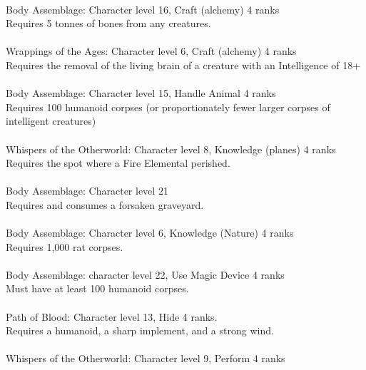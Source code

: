 \begin{multicols}{2}
\begin{small}
\\
Body Assemblage: Character level 16, Craft (alchemy) 4 ranks\\
Requires 5 tonnes of bones from any creatures.\\
\vspace{20pt}
\\
Wrappings of the Ages: Character level 6, Craft (alchemy) 4 ranks\\
Requires the removal of the living brain of a creature with an Intelligence of 18+\\
\\
Body Assemblage: Character level 15, Handle Animal 4 ranks\\
Requires 100 humanoid corpses (or proportionately fewer larger corpses of intelligent creatures)\\
\\
Whispers of the Otherworld: Character level 8, Knowledge (planes) 4 ranks\\
Requires the spot where a Fire Elemental perished.\\
\\
Body Assemblage: Character level 21\\
Requires and consumes a forsaken graveyard.\\
\\
Body Assemblage: Character level 6, Knowledge (Nature) 4 ranks\\
Requires 1,000 rat corpses.\\
\\
Body Assemblage: character level 22, Use Magic Device 4 ranks\\
Must have at least 100 humanoid corpses.\\
\\
Path of Blood: Character level 13, Hide 4 ranks.\\
Requires a humanoid, a sharp implement, and a strong wind.\\
\\
Whispers of the Otherworld: Character level 9, Perform 4 ranks\\

\end{small}
\end{multicols}
